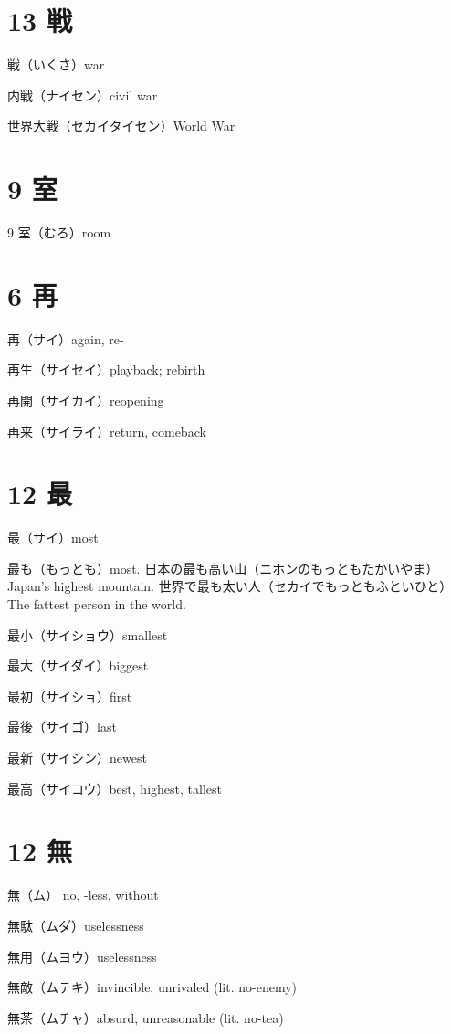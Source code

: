 \section{13 戦}

戦（いくさ）war

内戦（ナイセン）civil war

世界大戦（セカイタイセン）World War

\section{9 室}

9 室（むろ）room

\section{6 再}

再（サイ）again, re-

再生（サイセイ）playback; rebirth

再開（サイカイ）reopening

再来（サイライ）return, comeback

\section{12 最}

最（サイ）most

最も（もっとも）most.
日本の最も高い山（ニホンのもっともたかいやま）Japan's highest mountain.
世界で最も太い人（セカイでもっともふといひと）The fattest person in the world.

最小（サイショウ）smallest

最大（サイダイ）biggest

最初（サイショ）first

最後（サイゴ）last

最新（サイシン）newest

最高（サイコウ）best, highest, tallest

\section{12 無}

無（ム） no, -less, without

無駄（ムダ）uselessness

無用（ムヨウ）uselessness

無敵（ムテキ）invincible, unrivaled (lit. no-enemy)

無茶（ムチャ）absurd, unreasonable (lit. no-tea)

